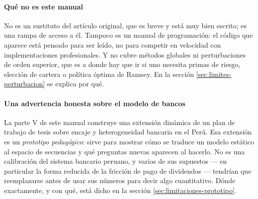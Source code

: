 \paragraph{Qué no es este manual}
No es un sustituto del artículo original, que es breve y está muy bien escrito;
es una rampa de acceso a él. Tampoco es un manual de programación: el código que
aparece está pensado para ser leído, no para competir en velocidad con
implementaciones profesionales. Y no cubre métodos globales ni perturbaciones de
orden superior, que es a donde hay que ir si uno necesita primas de riesgo,
elección de cartera o política óptima de Ramsey. En la sección
\ref{sec:limites-perturbacion} se explica por qué.

\paragraph{Una advertencia honesta sobre el modelo de bancos}
La parte V de este manual construye una extensión dinámica de un plan de trabajo
de tesis sobre encaje y heterogeneidad bancaria en el Perú. Esa extensión es un
\emph{prototipo pedagógico}: sirve para mostrar cómo se traduce un modelo
estático al espacio de secuencias y qué preguntas nuevas aparecen al hacerlo.
No es una calibración del sistema bancario peruano, y varios de sus supuestos
--- en particular la forma reducida de la fricción de pago de dividendos ---
tendrían que reemplazarse antes de usar sus números para decir algo cuantitativo.
Dónde exactamente, y con qué, está dicho en la sección \ref{sec:limitaciones-prototipo}.
